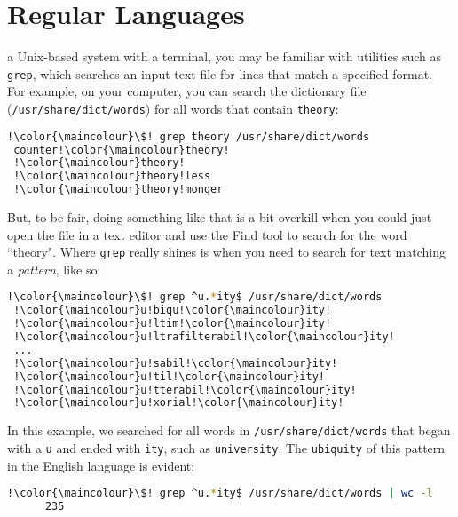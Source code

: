\chapter{Regular Languages}\label{chap:regular}

 a Unix-based system with a terminal, you may be familiar with utilities such as \texttt{grep}, which searches an input text file for lines that match a specified format. For example, on your computer, you can search the dictionary file (\texttt{/usr/share/dict/words}) for all words that contain {\color{\maincolour}\texttt{theory}}:

\lstset{style=codeblock,basicstyle=\small\ttfamily}
\begin{lstlisting}[language=bash,xleftmargin=0cm]
 !\color{\maincolour}\$! grep theory /usr/share/dict/words
 counter!\color{\maincolour}theory!
 !\color{\maincolour}theory!
 !\color{\maincolour}theory!less
 !\color{\maincolour}theory!monger
\end{lstlisting}

But, to be fair, doing something like that is a bit overkill when you could just open the file in a text editor and use the Find tool to search for the word ``theory". Where \texttt{grep} really shines is when you need to search for text matching a \emph{pattern}, like so:

\begin{lstlisting}[language=bash,xleftmargin=0cm]
 !\color{\maincolour}\$! grep ^u.*ity$ /usr/share/dict/words
 !\color{\maincolour}u!biqu!\color{\maincolour}ity!
 !\color{\maincolour}u!ltim!\color{\maincolour}ity!
 !\color{\maincolour}u!ltrafilterabil!\color{\maincolour}ity!
 ...
 !\color{\maincolour}u!sabil!\color{\maincolour}ity!
 !\color{\maincolour}u!til!\color{\maincolour}ity!
 !\color{\maincolour}u!tterabil!\color{\maincolour}ity!
 !\color{\maincolour}u!xorial!\color{\maincolour}ity!
\end{lstlisting}

In this example, we searched for all words in \texttt{/usr/share/dict/words} that began with a \texttt{u} and ended with \texttt{ity}, such as \texttt{{\color{\maincolour}\texttt{u}}nivers{\color{\maincolour}ity}}. The \texttt{{\color{\maincolour}u}biqu{\color{\maincolour}ity}} of this pattern in the English language is evident:

\begin{lstlisting}[language=bash,xleftmargin=0cm]
 !\color{\maincolour}\$! grep ^u.*ity$ /usr/share/dict/words | wc -l
      235
\end{lstlisting}

